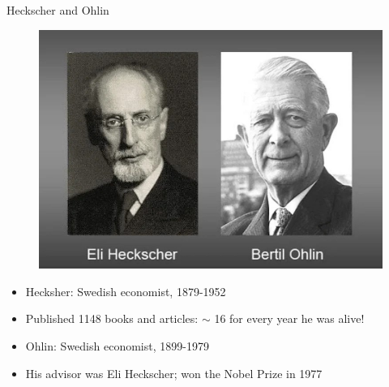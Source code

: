 \documentclass[notes,11pt, aspectratio=169, xcolor=table]{beamer}
\begin{document}
\begin{frame}{Heckscher and Ohlin}
\begin{figure}
    \centering
    \includegraphics[width=0.5\linewidth]{figs/heckscher-ohlin.jpeg}
\end{figure}

\begin{itemize}
    \item Hecksher: Swedish economist, 1879-1952
    \item Published 1148 books and articles: $\sim$ 16 for every year he was alive!
    \item Ohlin: Swedish economist, 1899-1979
    \item His advisor was Eli Heckscher; won the Nobel Prize in
1977
\end{itemize}

\end{frame}
\end{document}
